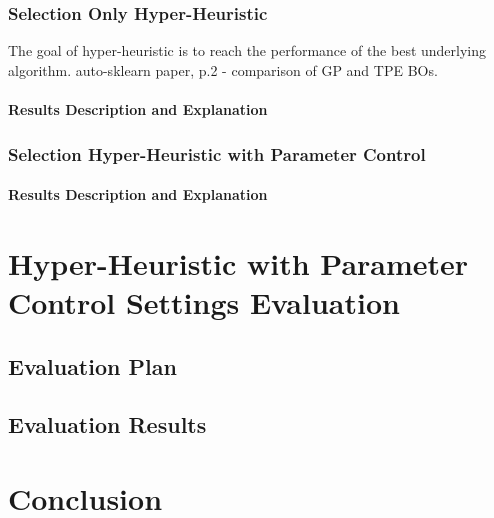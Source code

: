 \subsubsection{Selection Only Hyper-Heuristic}

The goal of hyper-heuristic is to reach the performance of the best underlying algorithm.
auto-sklearn paper, p.2 - comparison of GP and TPE BOs.

\paragraph{Results Description and Explanation}


\subsubsection{Selection Hyper-Heuristic with Parameter Control}

\paragraph{Results Description and Explanation}





\section{Hyper-Heuristic with Parameter Control Settings Evaluation}\label{eval: hh-pc}
\subsection{Evaluation Plan}\label{eval: hh-pc plan}
\subsection{Evaluation Results}\label{eval: hh-pc results}



\section{Conclusion}\label{eval: conclution}

